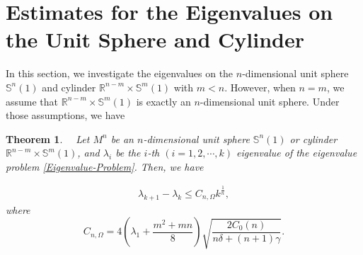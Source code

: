 \documentclass[12pt]{article}
\newtheorem{thm}{Theorem}[section]
\numberwithin{equation}{section}
\begin{document}
\section{ Estimates for the Eigenvalues on the Unit Sphere and Cylinder}\label{sec4}
In this section, we investigate the eigenvalues on the $n$-dimensional unit sphere $\mathbb{S}^{n}(1)$ and cylinder $\mathbb{R}^{n-m}\times\mathbb{S}^{m}(1)$ with $m<n$.
However, when $n=m$, we assume that $\mathbb{R}^{n-m}\times\mathbb{S}^{m}(1)$ is exactly an $n$-dimensional unit sphere. Under those assumptions, we have
\begin{thm}\label{thm-product-soliton}\ \ Let $M^{n}$ be an $n$-dimensional unit sphere $\mathbb{S}^{n}(1)$ or
cylinder $\mathbb{R}^{n-m}\times\mathbb{S}^{m}(1)$, and $\lambda_{i}$ be the $i$-th $(i=1,2,\cdots,k)$
eigenvalue of the eigenvalue problem \eqref{Eigenvalue-Problem}. Then, we have


\begin{equation}\label{ineq-sp-sl}\begin{aligned}\lambda_{k+1}-\lambda_{k}\leq
C_{n,\Omega}k^{\frac{1}{n}},\end{aligned}
\end{equation}
where $$C_{n,\Omega}=4\left(\lambda_{1}+\frac{m^{2}+mn}{8}\right)\sqrt{\frac{2C_{0}(n)}{n\delta+(n+1)\gamma}}.$$ \end{thm}
\end{document}
